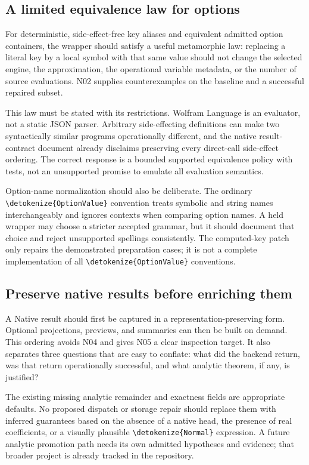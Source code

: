 \documentclass[11pt]{article}
\newcommand{\code}[1]{{\ttfamily\expandafter\nolinkurl\expandafter{\detokenize{#1}}}}
\begin{document}
\subsection{A limited equivalence law for options}
For deterministic, side-effect-free key aliases and equivalent admitted option containers, the wrapper should satisfy a useful metamorphic law: replacing a literal key by a local symbol with that same value should not change the selected engine, the approximation, the operational variable metadata, or the number of source evaluations. N02 supplies counterexamples on the baseline and a successful repaired subset.

This law must be stated with its restrictions. Wolfram Language is an evaluator, not a static JSON parser. Arbitrary side-effecting definitions can make two syntactically similar programs operationally different, and the native result-contract document already disclaims preserving every direct-call side-effect ordering. The correct response is a bounded supported equivalence policy with tests, not an unsupported promise to emulate all evaluation semantics.

Option-name normalization should also be deliberate. The ordinary \code{OptionValue} convention treats symbolic and string names interchangeably and ignores contexts when comparing option names. A held wrapper may choose a stricter accepted grammar, but it should document that choice and reject unsupported spellings consistently. The computed-key patch only repairs the demonstrated preparation cases; it is not a complete implementation of all \code{OptionValue} conventions.

\subsection{Preserve native results before enriching them}
A Native result should first be captured in a representation-preserving form. Optional projections, previews, and summaries can then be built on demand. This ordering avoids N04 and gives N05 a clear inspection target. It also separates three questions that are easy to conflate: what did the backend return, was that return operationally successful, and what analytic theorem, if any, is justified?

The existing missing analytic remainder and exactness fields are appropriate defaults. No proposed dispatch or storage repair should replace them with inferred guarantees based on the absence of a native head, the presence of real coefficients, or a visually plausible \code{Normal} expression. A future analytic promotion path needs its own admitted hypotheses and evidence; that broader project is already tracked in the repository.
\end{document}
